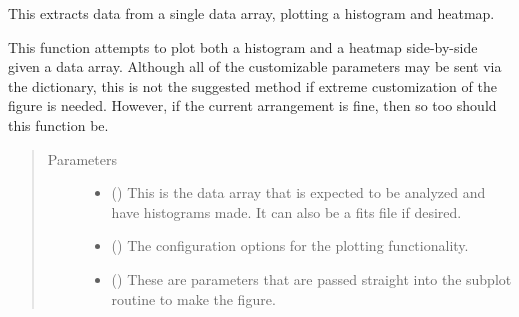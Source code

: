 \documentclass[letterpaper,10pt,english]{sphinxmanual}
\begin{document}
\begin{fulllineitems}
\label{\detokenize{python_docstrings/IfA_Smeargle.oscar.multi_figure:IfA_Smeargle.oscar.multi_figure.plot_single_heatmap_and_histogram}}
This extracts data from a single data array, plotting a histogram
and heatmap.

This function attempts to plot both a histogram and a heatmap
side-by-side given a data array. Although all of the customizable
parameters may be sent via the dictionary, this is not the suggested
method if extreme customization of the figure is needed. However, if the
current arrangement is fine, then so too should this function be.
\begin{quote}\begin{description}
\item[{Parameters}] \leavevmode\begin{itemize}
\item {} 
 () \textendash{} This is the data array that is expected to be analyzed and have
histograms made. It can also be a fits file if desired.

\item {} 
 ({\hyperref[\detokenize{python_docstrings/IfA_Smeargle.yankee.yankee_main:IfA_Smeargle.yankee.yankee_main.SmeargleConfig}]{}}\sphinxstyleliteralemphasis{\sphinxupquote{ (}}\sphinxstyleliteralemphasis{\sphinxupquote{)}}) \textendash{} The configuration options for the plotting functionality.

\item {} 
 () \textendash{} These are parameters that are passed straight into the subplot
routine to make the figure.


\end{itemize}
\end{description}
\end{quote}
\end{fulllineitems}
\end{document}

